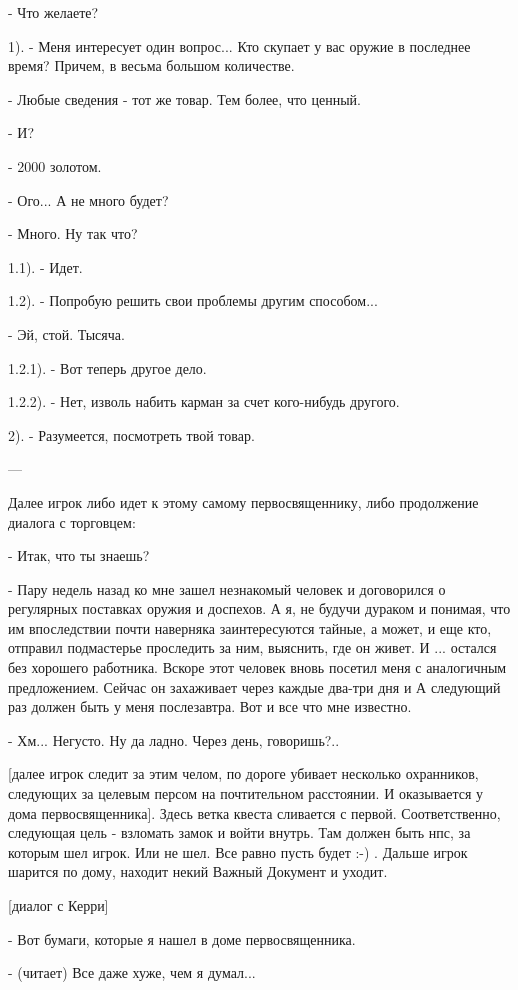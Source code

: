 \documentclass[12pt,a4paper]{book}
\begin{document}
- Что желаете?

1). - Меня интересует один вопрос... Кто скупает у вас оружие в последнее время? Причем, в весьма большом количестве.

- Любые сведения - тот же товар. Тем более, что ценный.

- И?

- 2000 золотом.

- Ого... А не много будет?

- Много. Ну так что?

1.1). - Идет.

1.2). - Попробую решить свои проблемы другим способом...

- Эй, стой. Тысяча.

1.2.1). - Вот теперь другое дело.

1.2.2). - Нет, изволь набить карман за счет кого-нибудь другого.

2). - Разумеется, посмотреть твой товар.

---

Далее игрок либо идет к этому самому первосвященнику, либо продолжение диалога с торговцем:

- Итак, что ты знаешь?

- Пару недель назад ко мне зашел незнакомый человек и договорился о регулярных поставках оружия и доспехов. А я, не будучи дураком и понимая, что им впоследствии почти наверняка заинтересуются тайные, а может, и еще кто, отправил подмастерье проследить за ним, выяснить, где он живет. И ... остался без хорошего работника. Вскоре этот человек вновь посетил меня с аналогичным предложением. Сейчас он захаживает через каждые два-три дня и А следующий раз должен быть у меня послезавтра. Вот и все что мне известно.

- Хм... Негусто. Ну да ладно. Через день, говоришь?..

[далее игрок следит за этим челом, по дороге убивает несколько охранников, следующих за целевым персом на почтительном расстоянии. И оказывается у дома первосвященника]. Здесь ветка квеста сливается с первой. Соответственно, следующая цель - взломать замок и войти внутрь. Там должен быть нпс, за которым шел игрок. Или не шел. Все равно пусть будет :-) . Дальше игрок шарится по дому, находит некий Важный Документ и уходит.

[диалог с Керри]

- Вот бумаги, которые я нашел в доме первосвященника.

- (читает) Все даже хуже, чем я думал...
\end{document}
